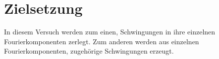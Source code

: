 \section{Zielsetzung}

\label{sec:Zielsetzung}
In diesem Versuch werden zum einen, Schwingungen in ihre einzelnen Fourierkomponenten zerlegt.
Zum anderen werden aus einzelnen Fourierkomponenten, zugehörige Schwingungen erzeugt.

